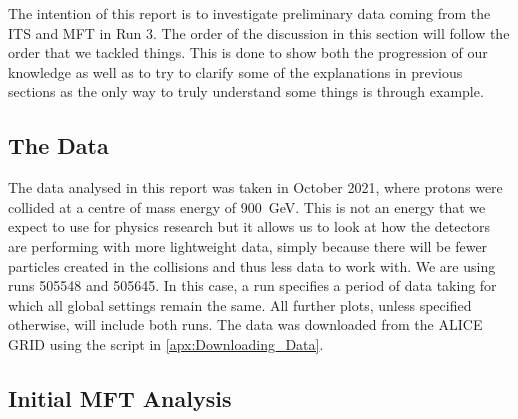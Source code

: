 The intention of this report is to investigate preliminary data coming from the ITS and MFT in Run 3. The order of the discussion in this section will follow the order that we tackled things. This is done to show both the progression of our knowledge as well as to try to clarify some of the explanations in previous sections as the only way to truly understand some things is through example. 

\subsection{The Data}
The data analysed in this report was taken in October 2021, where protons were collided at a centre of mass energy of \SI{900}{\giga\electronvolt}. This is not an energy that we expect to use for physics research but it allows us to look at how the detectors are performing with more lightweight data, simply because there will be fewer particles created in the collisions and thus less data to work with. We are using runs 505548 and 505645. In this case, a run specifies a period of data taking for which all global settings remain the same. All further plots, unless specified otherwise, will include both runs. The data was downloaded from the ALICE GRID using the script in \cref{apx:Downloading_Data}.


\subsection{Initial MFT Analysis}

